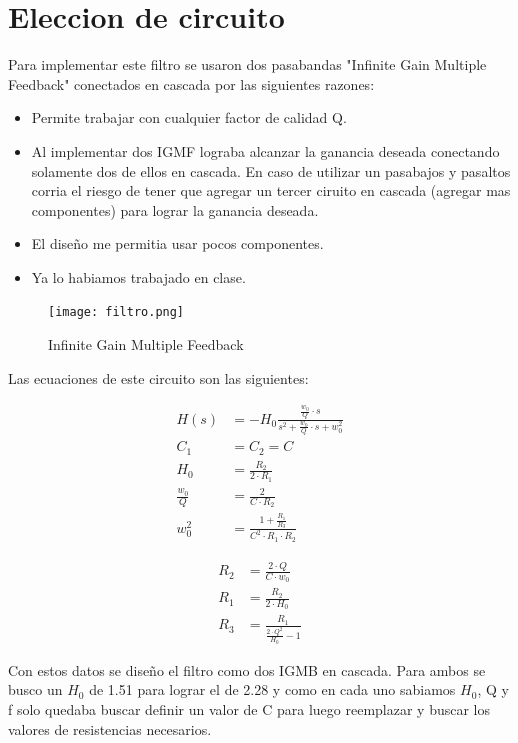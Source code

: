 \documentclass[11pt]{diazessay} %
\begin{document}
\section*{Eleccion de circuito}
Para implementar este filtro se usaron dos pasabandas "Infinite Gain Multiple Feedback" conectados en cascada por las siguientes razones: \\
\begin{itemize}
\item Permite trabajar con cualquier factor de calidad Q.\\
\item Al implementar dos IGMF lograba alcanzar la ganancia deseada conectando solamente dos de ellos en cascada. En caso de utilizar un pasabajos y pasaltos corria el riesgo de tener que agregar un tercer ciruito en cascada (agregar mas componentes) para lograr la ganancia deseada.\\
\item El diseño me permitia usar pocos componentes.\\
\item Ya lo habiamos trabajado en clase.
\end{itemize}
\begin{figure}[h]
\centering
	\texttt{[image: filtro.png]}
\caption{Infinite Gain Multiple Feedback}
\end{figure}

Las ecuaciones de este circuito son las siguientes:

\begin{align*}
H(s) &= -H_{0} \frac{ \frac{w_{0}}{Q} \cdot s }{ s^{2} + \frac{w_{0}}{Q} \cdot s + w_{0}^{2} } \\[10pt]
C_{1} &= C_{2} = C \\[10pt]
H_{0} &= \frac{R_{2}}{2 \cdot R_{1}} \\[10pt]
\frac{w_{0}}{Q} &= \frac{2}{C \cdot R_{2}} \\[10pt]
w_{0}^{2} &= \frac{ 1 + \frac{R_{1}}{R_{3}} }{ C^{2} \cdot R_{1} \cdot R_{2} }
\end{align*}

\newpage
\begin{align*}
R_{2} &= \frac{2 \cdot Q}{ C \cdot w_{0} } \\[10pt]
R_{1} &= \frac{ R_{2} }{ 2 \cdot H_{0} } \\[10pt]
R_{3} &= \frac{ R_{1} }{ \frac{2 \cdot Q^{2} }{ H_{0} } - 1 }
\end{align*}

Con estos datos se diseño el filtro como dos IGMB en cascada. Para ambos se busco un $H_{0}$ de 1.51 para lograr el de 2.28 y como en cada uno sabiamos $H_{0}$, Q y f solo quedaba buscar definir un valor de C para luego reemplazar y buscar los valores de resistencias necesarios.
\newpage
\end{document}
